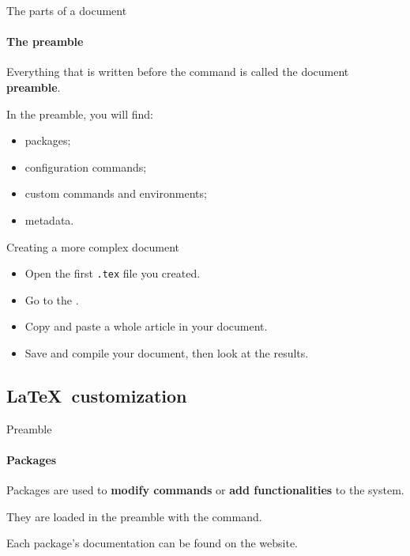 \begin{frame}[c,fragile]{The parts of a document}
	\framesubtitle{The preamble}
	Everything that is written before the  command is called
	the document \textbf{preamble}.
	

	In the preamble, you will find:
	\begin{itemize}
		\item packages;
		\item configuration commands;
		\item custom commands and environments;
		\item metadata.
	\end{itemize}
\end{frame}

\begin{frame}[c]{Creating a more complex document}
	\begin{itemize}
		\item Open the first \texttt{.tex} file you created.
		\item Go to the .
		\item Copy and paste a whole article in your document.
		\item Save and compile your document, then look at the results.
	\end{itemize}
\end{frame}

\subsection{\LaTeX\ customization}

\begin{frame}[fragile,c]{Preamble}
	\framesubtitle{Packages}
	Packages are used to \textbf{modify commands} or \textbf{add functionalities} to the system.
	
	They are loaded in the preamble with the  command.

	
	Each package's documentation can be found on the 
	 website.
\end{frame}

